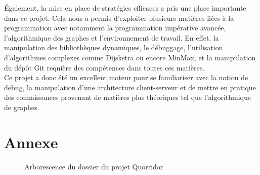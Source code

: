 \documentclass[11pt]{article}
\begin{document}
\'Egalement, la mise en place de stratégies efficaces a pris une place importante dans ce projet. Cela nous a permis d'exploiter plusieurs matières liées à la programmation avec notamment la programmation impérative avancée, l'algorithmique des graphes et l'environnement de travail. En effet, la manipulation des bibliothèques dynamiques, le débuggage, l'utilisation d'algorithmes complexes comme Dijskstra ou encore MinMax, et la manipulation du dépôt Git requière des compétences dans toutes ces matières. \\

Ce projet a donc été un excellent moteur pour se familiariser avec la notion de debug, la manipulation d'une architecture client-serveur et de mettre en pratique des connaissances provenant de matières plus théoriques tel que l'algorithmique de graphes.


\newpage

\nocite{*}
 


\section*{Annexe}

\begin{figure}[H]
    \caption{Arborescence du dossier du projet Quorridor}
    \label{fig:files-tree-structure}
\end{figure}
\end{document}
